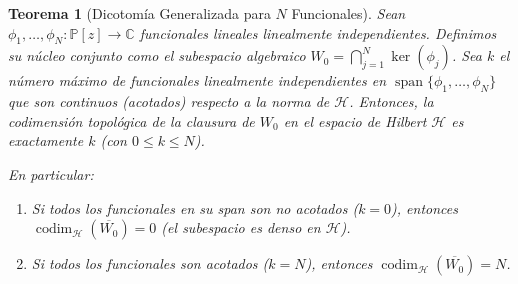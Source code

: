 \documentclass[12pt,a4paper]{article}
\newtheorem{theorem}{Teorema}
\theoremstyle{definition}
\theoremstyle{remark}
\newcommand{\Poly}{\mathbb{P}[z]}
\begin{document}
\begin{theorem}[Dicotomía Generalizada para $N$ Funcionales]\label{thm:dicotomia_N_general}
  Sean $\phi_1, \dots, \phi_N : \Poly \to \mathbb{C}$ funcionales lineales linealmente independientes. Definimos su núcleo conjunto como el subespacio algebraico $W_0 = \bigcap_{j=1}^N \ker(\phi_j)$.
  Sea $k$ el número máximo de funcionales linealmente independientes en $\operatorname{span}\{\phi_1, \dots, \phi_N\}$ que son continuos (acotados) respecto a la norma de $\mathcal{H}$.
  Entonces, la codimensión topológica de la clausura de $W_0$ en el espacio de Hilbert $\mathcal{H}$ es exactamente $k$ (con $0 \le k \le N$).

  En particular:
  \begin{enumerate}
    \item Si todos los funcionales en su span son no acotados ($k=0$), entonces $\operatorname{codim}_\mathcal{H}(\overline{W_0}) = 0$ (el subespacio es denso en $\mathcal{H}$).
    \item Si todos los funcionales son acotados ($k=N$), entonces $\operatorname{codim}_\mathcal{H}(\overline{W_0}) = N$.
  \end{enumerate}
\end{theorem}
\end{document}

